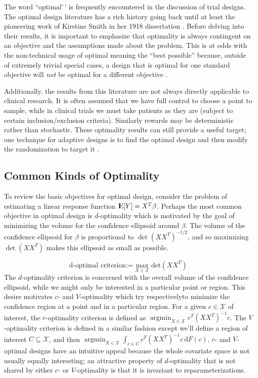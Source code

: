 \documentclass[12pt,,letterpaper,twoside]{report}
\DeclareMathOperator{\E}{{\rm I\kern-.3em E}}
\DeclareMathOperator*{\argmin}{argmin}
\begin{document}
The word ``optimal'\,' is frequently encountered in the discussion of
trial designs. The optimal design literature has a rich history going
back until at least the pioneering work of Kirstine Smith in her 1918
dissertation \citep{smith1918standard}. Before delving into their
results, it is important to emphasize that optimality is always
contingent on an objective and the assumptions made about the problem.
This is at odds with the non-technical usage of optimal meaning the
``best possible'' because, outside of extremely trivial special cases, a
design that is optimal for one standard objective will \emph{not} be
optimal for a different objective
\citep{silvey1980optimal, bubeck2009pure}.

Additionally, the results from this literature are not always directly
applicable to clinical research. It is often assumed that we have full
control to choose a point to sample, while in clinical trials we must
take patients as they are (subject to certain inclusion/exclusion
criteria). Similarly rewards may be deterministic rather than
stochastic. These optimality results can still provide a useful target;
one technique for adaptive designs is to find the optimal design and
then modify the randomization to target it
\citep{atkinson1982optimum, atkinson1992optimum}.

\hypertarget{common-kinds-of-optimality}{%
\subsection{Common Kinds of
Optimality}\label{common-kinds-of-optimality}}

To review the basic objectives for optimal design, consider the problem
of estimating a linear response function \(\E[Y] = X^T \beta\). Perhaps
the most common objective in optimal design is \(d\)-optimality which is
motivated by the goal of minimizing the volume for the confidence
ellipsoid around \(\beta\). The volume of the confidence ellipsoid for
\(\beta\) is proportional to \(\det{(XX^T)}^{-1/2}\), and so maximizing
\(\det{(XX^T)}\) makes this ellipsoid as small as possible.

\[\text{d-optimal criterion:=} \max_{X \in \mathcal{X}}  \text{det}\left(XX^T\right)\]
The \(d\)-optimality criterion is concerned with the overall volume of
the confidence ellipsoid, while we might only be interested in a
particular point or region. This desire motivates \(c\)- and
\(V\)-optimality which try respectivelyto minimize the confidence region
at a point and in a particular region. For a given \(c \in \mathcal{X}\)
of interest, the \(c\)-optimality criterion is defined as
\(\argmin_{X \in \mathcal{X}} c^T(XX^T)^{-1}c\). The \(V\)-optimality
criterion is defined in a similar fashion except we'll define a region
of interest \(C \subseteq \mathcal{X}\), and then
\(\argmin_{X \in \mathcal{X}} \int_{c \in C}c^T(XX^T)^{-1}c \, \mathrm{d}F(c)\).
\(c\)- and \(V\)- optimal designs have an intuitive appeal because the
whole covariate space is not usually equally interesting; an attractive
property of \(d\)-optimality that is not shared by either \(c\)- or
\(V\)-optimality is that it is invariant to reparameterizations.
\end{document}
